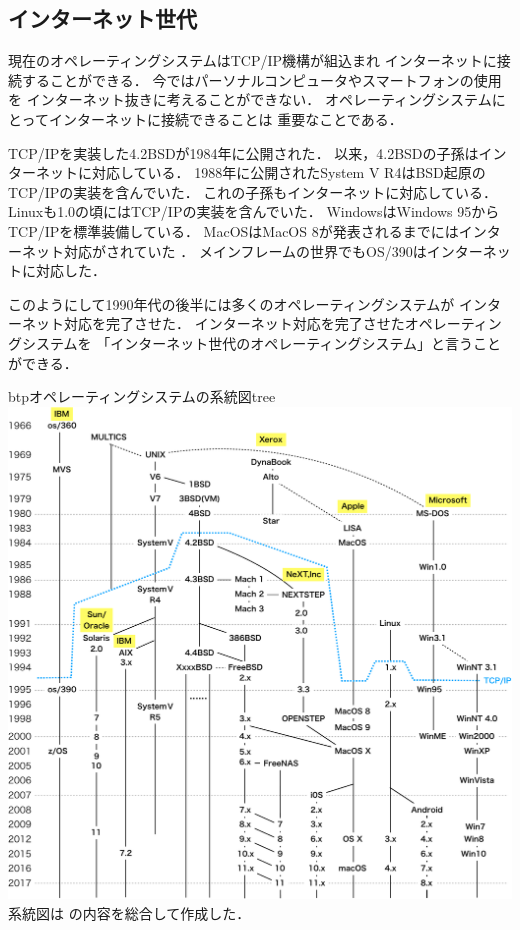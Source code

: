 \subsection{インターネット世代}
現在のオペレーティングシステムはTCP/IP機構が組込まれ
インターネットに接続することができる．
今ではパーソナルコンピュータやスマートフォンの使用を
インターネット抜きに考えることができない．
オペレーティングシステムにとってインターネットに接続できることは
重要なことである．

TCP/IPを実装した4.2BSDが1984年に公開された\cite{bsd}．
以来，4.2BSDの子孫はインターネットに対応している．
1988年に公開されたSystem V R4はBSD起原のTCP/IPの実装を含んでいた\cite{svr4}．
これの子孫もインターネットに対応している．
Linuxも1.0の頃にはTCP/IPの実装を含んでいた\cite{linux1}．
WindowsはWindows 95からTCP/IPを標準装備している\cite{windows}．
MacOSはMacOS 8が発表されるまでにはインターネット対応がされていた
\cite{classicmacos}．
メインフレームの世界でもOS/390はインターネットに対応した\cite{os390}．

このようにして1990年代の後半には多くのオペレーティングシステムが
インターネット対応を完了させた．
インターネット対応を完了させたオペレーティングシステムを
「インターネット世代のオペレーティングシステム」と言うことができる．

\begin{myfig}{btp}{オペレーティングシステムの系統図}{tree}
\includegraphics[scale=0.6]{Fig/tree-crop.pdf}\\
{\small
系統図は\cite{os360,
mvs,
os390,
zos,
unix,
solaris,
aix,
mach,
bsd,
bsdd,
386bsd,
freebsd,
freenas,
nextstep,
classicmacos,
dynabook,
macos,
ios,
linux,
android,
msdos,
windows}
の内容を総合して作成した．}
\end{myfig}

